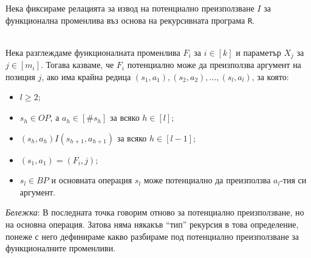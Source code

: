 \documentclass[12pt,twoside,a4paper]{article}
\begin{document}
	Нека фиксираме релацията за извод на потенциално преизползване $I$ за функционална променлива въз основа на рекурсивната програма \texttt{R}.
	
	\begin{definition}\label{def:pot-reuse}~\\
		\indent Нека разглеждаме функционалната променлива $F_i$ за $i \in [k]$ и параметър $X_j$ за $j \in [m_i]$. Тогава казваме, че $F_i$ потенциално може да преизползва аргумент на позиция $j$, ако има крайна редица $(s_1, a_1), (s_2, a_2), \dots, (s_l, a_l)$, за която:
		\begin{itemize}
			\item $l \ge 2$;
			\item $s_h \in OP$, а $a_h \in [\#s_h]$ за всяко $h \in [l]$;
			\item $(s_h, a_h)I(s_{h+1}, a_{h+1})$ за всяко $h \in [l-1]$;
			\item $(s_1, a_1) = (F_i, j)$;
			\item $s_l \in BP$ и основната операция $s_l$ може потенциално да преизползва $a_l$-тия си аргумент.
		\end{itemize}
		
		\textit{Бележка}: В последната точка говорим отново за потенциално преизползване, но на основна операция. Затова няма някакъв "`тип"' рекурсия в това определение, понеже с него дефинираме какво разбираме под потенциално преизползване за функционалните променливи.
	\end{definition}
	
\end{document}
